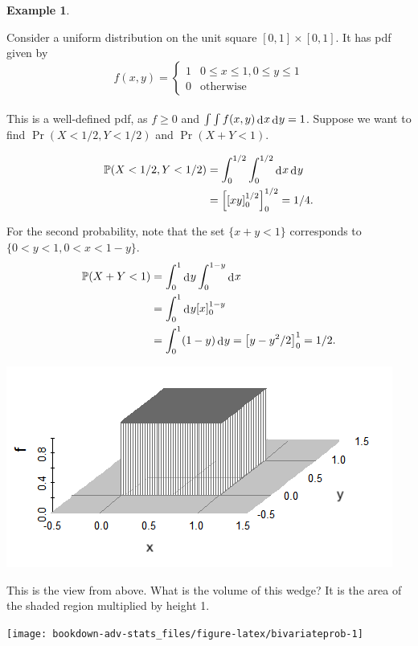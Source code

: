 \documentclass[
]{book}
\newcommand{\bbP}{\mathbb{P}}
\DeclareMathOperator{\dd}{d}
\newcommand{\dint}{\dd\hspace{0.5pt}\!}
\theoremstyle{definition}
\theoremstyle{definition}
\newtheorem{example}{Example}[chapter]
\theoremstyle{definition}
\theoremstyle{definition}
\theoremstyle{remark}
\begin{document}
\begin{example}
\protect\hypertarget{exm:unitsquare}{}\label{exm:unitsquare}

Consider a uniform distribution on the unit square \([0,1] \times [0,1]\). It has pdf given by
\[
f(x,y) = \begin{cases}
  1 &0\leq x \leq 1, 0\leq y \leq 1 \\
  0 &\text{otherwise}
\end{cases}
\]\\
This is a well-defined pdf, as \(f\geq 0\) and \(\int\int f(x,y)\dint x \dint y = 1\).
Suppose we want to find \(\Pr(X<1/2, Y<1/2)\) and \(\Pr(X + Y < 1)\).

\begin{align*}
\bbP(X<1/2, Y<1/2) &= \int_0^{1/2} \int_0^{1/2} \dint x \dint y \\
&= \left[ \left[ xy \right]_{0}^{1/2} \right]_{0}^{1/2} = 1/4.
\end{align*}

For the second probability, note that the set \(\{x+y<1\}\) corresponds to \(\{0<y<1, 0<x < 1-y\}\).
\begin{align*}
  \bbP(X+Y<1) &= \int_0^{1} \dint y \int_0^{1-y}  \dint x \\
  &= \int_0^{1} \dint y [x]_0^{1-y} \\
  &= \int_0^{1} (1-y) \dint y = \big[y - y^2/2\big]_0^1 = 1/2.
\end{align*}

\begin{center}\includegraphics[width=0.8\linewidth]{figure/bivariateunif} \end{center}

This is the view from above. What is the volume of this wedge? It is the area of the shaded region multiplied by height 1.

\begin{center}\texttt{[image: bookdown-adv-stats\_files/figure-latex/bivariateprob-1]} \end{center}

\end{example}
\end{document}
